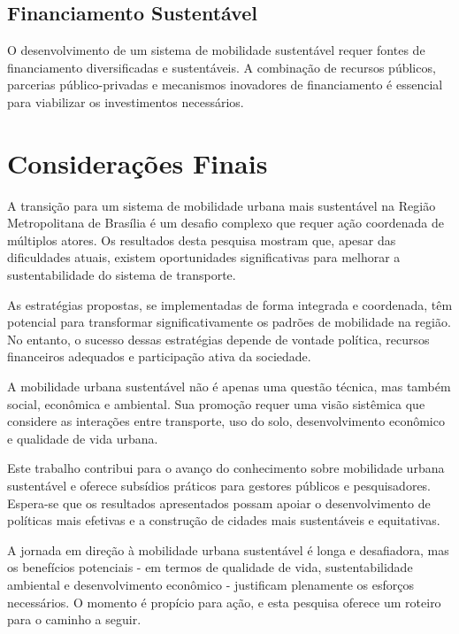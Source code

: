 \subsection{Financiamento Sustentável}

O desenvolvimento de um sistema de mobilidade sustentável requer fontes de financiamento diversificadas e sustentáveis. A combinação de recursos públicos, parcerias público-privadas e mecanismos inovadores de financiamento é essencial para viabilizar os investimentos necessários.

\section{Considerações Finais}

A transição para um sistema de mobilidade urbana mais sustentável na Região Metropolitana de Brasília é um desafio complexo que requer ação coordenada de múltiplos atores. Os resultados desta pesquisa mostram que, apesar das dificuldades atuais, existem oportunidades significativas para melhorar a sustentabilidade do sistema de transporte.

As estratégias propostas, se implementadas de forma integrada e coordenada, têm potencial para transformar significativamente os padrões de mobilidade na região. No entanto, o sucesso dessas estratégias depende de vontade política, recursos financeiros adequados e participação ativa da sociedade.

A mobilidade urbana sustentável não é apenas uma questão técnica, mas também social, econômica e ambiental. Sua promoção requer uma visão sistêmica que considere as interações entre transporte, uso do solo, desenvolvimento econômico e qualidade de vida urbana.

Este trabalho contribui para o avanço do conhecimento sobre mobilidade urbana sustentável e oferece subsídios práticos para gestores públicos e pesquisadores. Espera-se que os resultados apresentados possam apoiar o desenvolvimento de políticas mais efetivas e a construção de cidades mais sustentáveis e equitativas.

A jornada em direção à mobilidade urbana sustentável é longa e desafiadora, mas os benefícios potenciais - em termos de qualidade de vida, sustentabilidade ambiental e desenvolvimento econômico - justificam plenamente os esforços necessários. O momento é propício para ação, e esta pesquisa oferece um roteiro para o caminho a seguir.